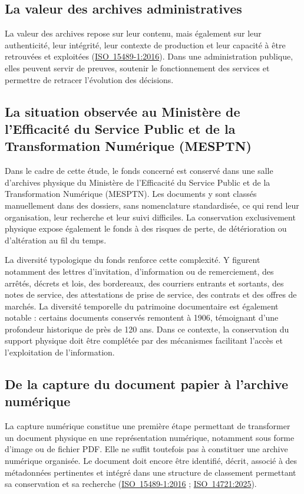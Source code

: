 \documentclass[12pt,a4paper]{report}
\newcommand{\citer}[2]{\hyperref[ref:#1]{#2}}
\newcommand{\nomMinistere}{Ministère de l'Efficacité du Service Public et de la Transformation Numérique (MESPTN)}
\begin{document}
\subsection{La valeur des archives administratives}
La valeur des archives repose sur leur contenu, mais également sur leur authenticité, leur intégrité, leur contexte de production et leur capacité à être retrouvées et exploitées (\citer{iso15489}{\mbox{ISO 15489-1:2016}}). Dans une administration publique, elles peuvent servir de preuves, soutenir le fonctionnement des services et permettre de retracer l'évolution des décisions.

\subsection{La situation observée au \nomMinistere{}}
Dans le cadre de cette étude, le fonds concerné est conservé dans une salle d'archives physique du \nomMinistere{}. Les documents y sont classés manuellement dans des dossiers, sans nomenclature standardisée, ce qui rend leur organisation, leur recherche et leur suivi difficiles. La conservation exclusivement physique expose également le fonds à des risques de perte, de détérioration ou d'altération au fil du temps.

La diversité typologique du fonds renforce cette complexité. Y figurent notamment des lettres d'invitation, d'information ou de remerciement, des arrêtés, décrets et lois, des bordereaux, des courriers entrants et sortants, des notes de service, des attestations de prise de service, des contrats et des offres de marchés. La diversité temporelle du patrimoine documentaire est également notable : certains documents conservés remontent à 1906, témoignant d'une profondeur historique de près de 120 ans. Dans ce contexte, la conservation du support physique doit être complétée par des mécanismes facilitant l'accès et l'exploitation de l'information.

\subsection{De la capture du document papier à l'archive numérique}
La capture numérique constitue une première étape permettant de transformer un document physique en une représentation numérique, notamment sous forme d'image ou de fichier PDF. Elle ne suffit toutefois pas à constituer une archive numérique organisée. Le document doit encore être identifié, décrit, associé à des métadonnées pertinentes et intégré dans une structure de classement permettant sa conservation et sa recherche (\citer{iso15489}{\mbox{ISO 15489-1:2016}} ; \citer{iso14721}{\mbox{ISO 14721:2025}}).
\end{document}
